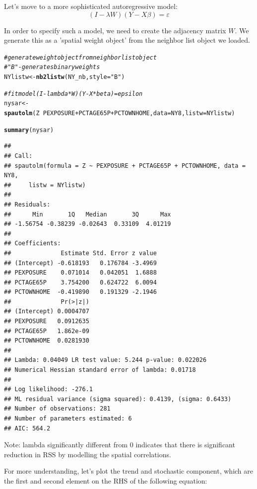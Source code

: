 \documentclass{article}\usepackage[]{graphicx}\usepackage[]{color}
\makeatletter
\newcommand{\hlstr}[1]{\textcolor[rgb]{0.192,0.494,0.8}{#1}}%
\newcommand{\hlcom}[1]{\textcolor[rgb]{0.678,0.584,0.686}{\textit{#1}}}%
\newcommand{\hlopt}[1]{\textcolor[rgb]{0,0,0}{#1}}%
\newcommand{\hlstd}[1]{\textcolor[rgb]{0.345,0.345,0.345}{#1}}%
\newcommand{\hlkwb}[1]{\textcolor[rgb]{0.69,0.353,0.396}{#1}}%
\newcommand{\hlkwc}[1]{\textcolor[rgb]{0.333,0.667,0.333}{#1}}%
\newcommand{\hlkwd}[1]{\textcolor[rgb]{0.737,0.353,0.396}{\textbf{#1}}}%
\newenvironment{kframe}{%
 \def\at@end@of@kframe{}%
 \ifinner\ifhmode%
  \def\at@end@of@kframe{\end{minipage}}%
  \begin{minipage}{\columnwidth}%
 \fi\fi%
 \def\FrameCommand##1{\hskip\@totalleftmargin \hskip-\fboxsep
 \colorbox{shadecolor}{##1}\hskip-\fboxsep
     \hskip-\linewidth \hskip-\@totalleftmargin \hskip\columnwidth}%
 \MakeFramed {\advance\hsize-\width
   \@totalleftmargin\z@ \linewidth\hsize
   \@setminipage}}%
 {\par\unskip\endMakeFramed%
 \at@end@of@kframe}
\newenvironment{knitrout}{}{} %
\makeatother
\begin{document}
Let's move to a more sophisticated autoregressive model:
$$
 (I - \lambda W)(Y- X\beta) = \varepsilon
$$

In order to specify such a model, we need to create the adjacency matrix $W$. We generate this as a 'spatial weight object' from the neighbor list object we loaded.

\begin{knitrout}
\color{fgcolor}\begin{kframe}
\begin{alltt}
\hlcom{# generate weight object from neighbor list object}
\hlcom{# "B" - generates binary weights}
\hlstd{NYlistw}\hlkwb{<-}\hlkwd{nb2listw}\hlstd{(NY_nb,} \hlkwc{style} \hlstd{=} \hlstr{"B"}\hlstd{)}

\hlcom{# fit model (I - lambda* W)(Y- X* beta) = epsilon}
\hlstd{nysar}\hlkwb{<-}\hlkwd{spautolm}\hlstd{(Z}\hlopt{~}\hlstd{PEXPOSURE}\hlopt{+}\hlstd{PCTAGE65P}\hlopt{+}\hlstd{PCTOWNHOME,} \hlkwc{data}\hlstd{=NY8,} \hlkwc{listw}\hlstd{=NYlistw)}

\hlkwd{summary}\hlstd{(nysar)}
\end{alltt}
\begin{verbatim}
## 
## Call: 
## spautolm(formula = Z ~ PEXPOSURE + PCTAGE65P + PCTOWNHOME, data = NY8, 
##     listw = NYlistw)
## 
## Residuals:
##      Min       1Q   Median       3Q      Max 
## -1.56754 -0.38239 -0.02643  0.33109  4.01219 
## 
## Coefficients: 
##              Estimate Std. Error z value
## (Intercept) -0.618193   0.176784 -3.4969
## PEXPOSURE    0.071014   0.042051  1.6888
## PCTAGE65P    3.754200   0.624722  6.0094
## PCTOWNHOME  -0.419890   0.191329 -2.1946
##              Pr(>|z|)
## (Intercept) 0.0004707
## PEXPOSURE   0.0912635
## PCTAGE65P   1.862e-09
## PCTOWNHOME  0.0281930
## 
## Lambda: 0.04049 LR test value: 5.244 p-value: 0.022026 
## Numerical Hessian standard error of lambda: 0.01718 
## 
## Log likelihood: -276.1 
## ML residual variance (sigma squared): 0.4139, (sigma: 0.6433)
## Number of observations: 281 
## Number of parameters estimated: 6 
## AIC: 564.2
\end{verbatim}
\end{kframe}
\end{knitrout}


Note: lambda significantly different from 0 indicates that there is significant reduction in RSS by modelling the spatial correlations.

For more understanding, let's plot the trend and stochastic component, which are the first and second element on the RHS of the following equation:
\end{document}
